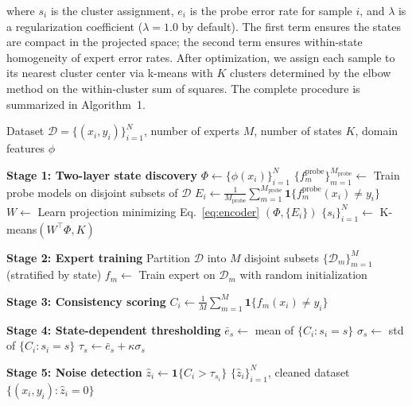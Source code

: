 where $s_i$ is the cluster assignment, $e_i$ is the probe error rate for sample $i$, and $\lambda$ is a regularization coefficient ($\lambda = 1.0$ by default). The first term ensures the states are compact in the projected space; the second term ensures within-state homogeneity of expert error rates. After optimization, we assign each sample to its nearest cluster center via k-means with $K$ clusters determined by the elbow method on the within-cluster sum of squares. The complete procedure is summarized in Algorithm~1.

\begin{algorithm}[t]
\caption{SCX: State-Conditioned eXpertise Consistency for Noise Detection}
\label{alg:scx}
\begin{algorithmic}[1]
\Require Dataset $\mathcal{D} = \{(x_i, y_i)\}_{i=1}^N$, number of experts $M$, number of states $K$, domain features $\phi$

\State \textbf{Stage 1: Two-layer state discovery}
\State $\Phi \gets \{\phi(x_i)\}_{i=1}^N$ 
\State $\{f_m^{\text{probe}}\}_{m=1}^{M_{\text{probe}}} \gets$ Train probe models on disjoint subsets of $\mathcal{D}$
\State $E_i \gets \frac{1}{M_{\text{probe}}}\sum_{m=1}^{M_{\text{probe}}} \mathbf{1}\{f_m^{\text{probe}}(x_i) \neq y_i\}$ 
\State $W \gets$ Learn projection minimizing Eq.~\eqref{eq:encoder} $(\Phi, \{E_i\})$
\State $\{s_i\}_{i=1}^N \gets$ K-means$(W^\top \Phi, K)$ 

\State \textbf{Stage 2: Expert training}
\State Partition $\mathcal{D}$ into $M$ disjoint subsets $\{\mathcal{D}_m\}_{m=1}^M$ (stratified by state)
\State $f_m \gets$ Train expert on $\mathcal{D}_m$ with random initialization
\EndFor

\State \textbf{Stage 3: Consistency scoring}
\State $C_i \gets \frac{1}{M}\sum_{m=1}^M \mathbf{1}\{f_m(x_i) \neq y_i\}$ 
\EndFor

\State \textbf{Stage 4: State-dependent thresholding}
\State $\bar{e}_s \gets$ mean of $\{C_i : s_i = s\}$
\State $\sigma_s \gets$ std of $\{C_i : s_i = s\}$
\State $\tau_s \gets \bar{e}_s + \kappa \sigma_s$ 
\EndFor

\State \textbf{Stage 5: Noise detection}
\State $\hat{z}_i \gets \mathbf{1}\{C_i > \tau_{s_i}\}$ 
\State \Return $\{\hat{z}_i\}_{i=1}^N$, cleaned dataset $\{(x_i, y_i) : \hat{z}_i = 0\}$
\end{algorithmic}
\end{algorithm}

